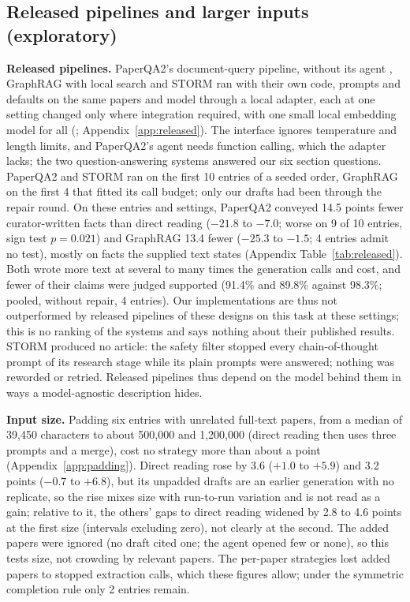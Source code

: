 \documentclass{article} %
\begin{document}
\subsection{Released pipelines and larger inputs (exploratory)}
\label{sec:released}
\textbf{Released pipelines.} PaperQA2's document-query pipeline, without its agent \citep{skarlinski2024language}, GraphRAG with local search \citep{edge2024local} and STORM \citep{shao2024assisting} ran with their own code, prompts and defaults on the same papers and model through a local adapter, each at one setting changed only where integration required, with one small local embedding model for all (\citealp{Xiao2023CpackPacked}; Appendix~\ref{app:released}). The interface ignores temperature and length limits, and PaperQA2's agent needs function calling, which the adapter lacks; the two question-answering systems answered our six section questions. PaperQA2 and STORM ran on the first 10 entries of a seeded order, GraphRAG on the first 4 that fitted its call budget; only our drafts had been through the repair round. On these entries and settings, PaperQA2 conveyed 14.5 points fewer curator-written facts than direct reading ($-21.8$ to $-7.0$; worse on 9 of 10 entries, sign test $p=0.021$) and GraphRAG 13.4 fewer ($-25.3$ to $-1.5$; 4 entries admit no test), mostly on facts the supplied text states (Appendix Table~\ref{tab:released}). Both wrote more text at several to many times the generation calls and cost, and fewer of their claims were judged supported (91.4\% and 89.8\% against 98.3\%; pooled, without repair, 4 entries). Our implementations are thus not outperformed by released pipelines of these designs on this task at these settings; this is no ranking of the systems and says nothing about their published results. STORM produced no article: the safety filter stopped every chain-of-thought prompt of its research stage while its plain prompts were answered; nothing was reworded or retried. Released pipelines thus depend on the model behind them in ways a model-agnostic description hides.

\textbf{Input size.} Padding six entries with unrelated full-text papers, from a median of 39,450 characters to about 500,000 and 1,200,000 (direct reading then uses three prompts and a merge), cost no strategy more than about a point (Appendix~\ref{app:padding}). Direct reading rose by 3.6 ($+1.0$ to $+5.9$) and 3.2 points ($-0.7$ to $+6.8$), but its unpadded drafts are an earlier generation with no replicate, so the rise mixes size with run-to-run variation and is not read as a gain; relative to it, the others' gaps to direct reading widened by 2.8 to 4.6 points at the first size (intervals excluding zero), not clearly at the second. The added papers were ignored (no draft cited one; the agent opened few or none), so this tests size, not crowding by relevant papers. The per-paper strategies lost added papers to stopped extraction calls, which these figures allow; under the symmetric completion rule only 2 entries remain.
\end{document}
